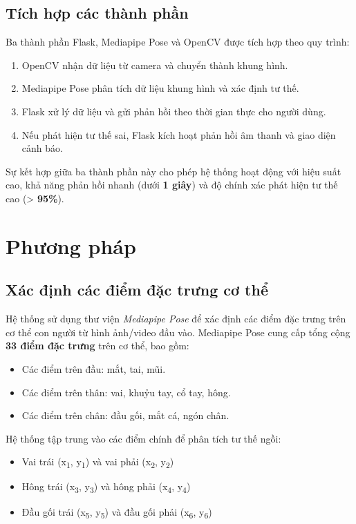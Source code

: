 \documentclass[journal,onecolumn]{IEEEtran}
\begin{document}
\subsection{\textbf{Tích hợp các thành phần}}
Ba thành phần Flask, Mediapipe Pose và OpenCV được tích hợp theo quy trình:
\begin{enumerate}
    \item OpenCV nhận dữ liệu từ camera và chuyển thành khung hình.
    \item Mediapipe Pose phân tích dữ liệu khung hình và xác định tư thế.
    \item Flask xử lý dữ liệu và gửi phản hồi theo thời gian thực cho người dùng.
    \item Nếu phát hiện tư thế sai, Flask kích hoạt phản hồi âm thanh và giao diện cảnh báo.
\end{enumerate}

Sự kết hợp giữa ba thành phần này cho phép hệ thống hoạt động với hiệu suất cao, khả năng phản hồi nhanh (dưới \textbf{1 giây}) và độ chính xác phát hiện tư thế cao (> \textbf{95\%}).


\section{\textbf{Phương pháp}}
\subsection{\textbf{Xác định các điểm đặc trưng cơ thể}}
Hệ thống sử dụng thư viện \textit{Mediapipe Pose} để xác định các điểm đặc trưng trên cơ thể con người từ hình ảnh/video đầu vào. Mediapipe Pose cung cấp tổng cộng \textbf{33 điểm đặc trưng} trên cơ thể, bao gồm:
\begin{itemize}
    \item Các điểm trên đầu: mắt, tai, mũi.
    \item Các điểm trên thân: vai, khuỷu tay, cổ tay, hông.
    \item Các điểm trên chân: đầu gối, mắt cá, ngón chân.
\end{itemize}

Hệ thống tập trung vào các điểm chính để phân tích tư thế ngồi:
\begin{itemize}
    \item Vai trái (x\textsubscript{1}, y\textsubscript{1}) và vai phải (x\textsubscript{2}, y\textsubscript{2})
    \item Hông trái (x\textsubscript{3}, y\textsubscript{3}) và hông phải (x\textsubscript{4}, y\textsubscript{4})
    \item Đầu gối trái (x\textsubscript{5}, y\textsubscript{5}) và đầu gối phải (x\textsubscript{6}, y\textsubscript{6})
\end{itemize}
\end{document}
